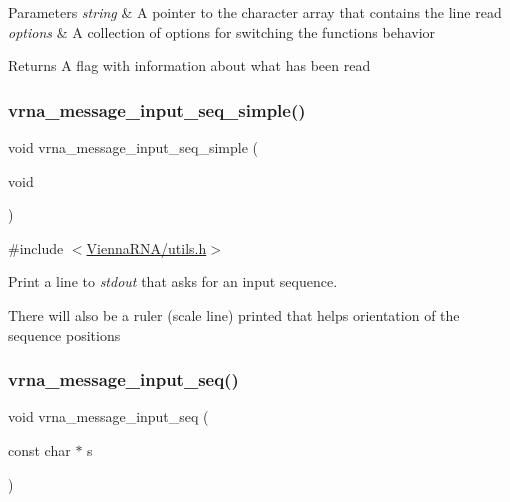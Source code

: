 \begin{DoxyParams}{Parameters}
{\em string} & A pointer to the character array that contains the line read \\
\hline
{\em options} & A collection of options for switching the functions behavior \\
\hline
\end{DoxyParams}
\begin{DoxyReturn}{Returns}
A flag with information about what has been read 
\end{DoxyReturn}
\mbox{\label{group__utils_gaee1dd652ca5b9e56b096963a1576f73b}} 
\subsubsection{\texorpdfstring{vrna\+\_\+message\+\_\+input\+\_\+seq\+\_\+simple()}{vrna\_message\_input\_seq\_simple()}}
{\footnotesize\ttfamily void vrna\+\_\+message\+\_\+input\+\_\+seq\+\_\+simple (\begin{DoxyParamCaption}\item[{void}]{ }\end{DoxyParamCaption})}



{\ttfamily \#include $<$\hyperlink{utils_8h}{Vienna\+R\+N\+A/utils.\+h}$>$}



Print a line to {\itshape stdout} that asks for an input sequence. 

There will also be a ruler (scale line) printed that helps orientation of the sequence positions \mbox{\label{group__utils_gaf4d194d558b0c975f269de01dea52460}} 
\subsubsection{\texorpdfstring{vrna\+\_\+message\+\_\+input\+\_\+seq()}{vrna\_message\_input\_seq()}}
{\footnotesize\ttfamily void vrna\+\_\+message\+\_\+input\+\_\+seq (\begin{DoxyParamCaption}\item[{const char $\ast$}]{s }\end{DoxyParamCaption})}



